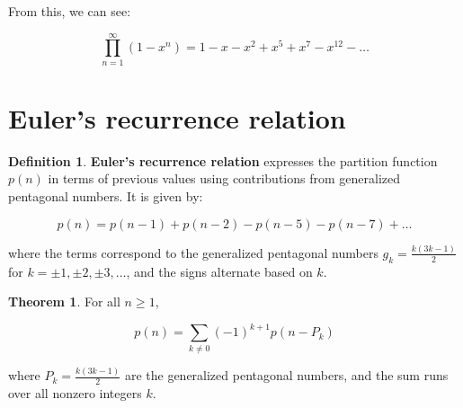 \documentclass{article}
\theoremstyle{definition}
\newtheorem{definition}{Definition}
\newtheorem{theorem}{Theorem}
\begin{document}
\noindent
From this, we can see:

\[
\prod_{n=1}^{\infty} (1 - x^n) = 1 - x - x^2 + x^5 + x^7 - x^{12} - \dots
\]

\section{Euler's recurrence relation}

\begin{definition}
\textbf{Euler’s recurrence relation} expresses the partition function \( p(n) \) in terms of previous
values using contributions from generalized pentagonal numbers. It is given by:

\[
p(n) = p(n-1) + p(n-2) - p(n-5) - p(n-7) + \dots
\]

\noindent
where the terms correspond to the generalized pentagonal numbers \( g_k = \frac{k(3k-1)}{2} \) for
\( k = \pm 1, \pm 2, \pm 3, \dots \), and the signs alternate based on \( k \).

\end{definition}

\begin{theorem}
For all \( n \geq 1 \),

\[
p(n) = \sum_{k \neq 0} (-1)^{k+1} p(n - P_k)
\]

\noindent
where \( P_k = \frac{k(3k-1)}{2} \) are the generalized pentagonal numbers, and the sum runs over all
nonzero integers \( k \).

\end{theorem}
\end{document}
